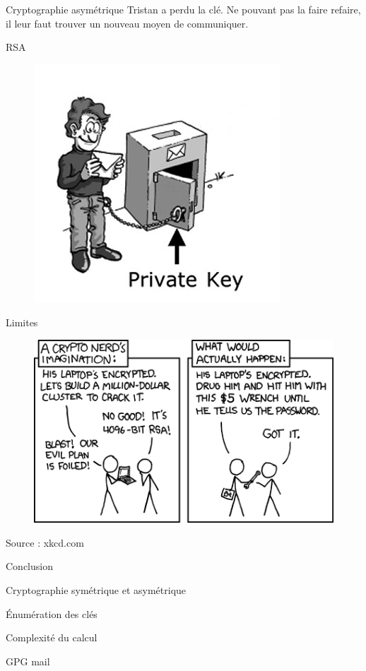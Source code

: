 \documentclass{beamer}
\begin{document}
\begin{frame}{Cryptographie asymétrique}
  Tristan a perdu la clé. Ne pouvant pas la faire refaire, il leur faut trouver un nouveau moyen de communiquer.
      \end{frame}

\begin{frame}{RSA}
    \begin{figure}
    \centering
    \includegraphics[scale = 0.5]{Public_Key.png}
  \end{figure}
  \end{frame}

\begin{frame}{Limites}
  \begin{figure}
    \centering
    \includegraphics[scale = 0.5]{xkcdsecurity.png}
  \end{figure}
\footnotesize{Source : xkcd.com}
\end{frame}

\begin{frame}{Conclusion}
  \begin{center}
  Cryptographie symétrique et asymétrique

  Énumération des clés  

  Complexité du calcul
\end{center}

  
  GPG mail

  \end{frame}
\end{document}
